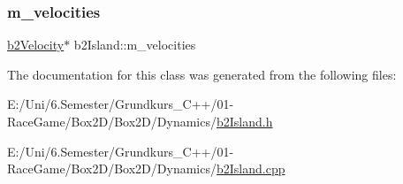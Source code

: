 \mbox{\label{classb2_island_ae6a42be7ce4c03724a6da17d96cacb9f}} 
\subsubsection{\texorpdfstring{m\_velocities}{m\_velocities}}
{\footnotesize\ttfamily \mbox{\hyperlink{structb2_velocity}{b2\+Velocity}}$\ast$ b2\+Island\+::m\+\_\+velocities}



The documentation for this class was generated from the following files\+:\begin{DoxyCompactItemize}
\item 
E\+:/\+Uni/6.\+Semester/\+Grundkurs\+\_\+\+C++/01-\/\+Race\+Game/\+Box2\+D/\+Box2\+D/\+Dynamics/\mbox{\hyperlink{b2_island_8h}{b2\+Island.\+h}}\item 
E\+:/\+Uni/6.\+Semester/\+Grundkurs\+\_\+\+C++/01-\/\+Race\+Game/\+Box2\+D/\+Box2\+D/\+Dynamics/\mbox{\hyperlink{b2_island_8cpp}{b2\+Island.\+cpp}}\end{DoxyCompactItemize}
